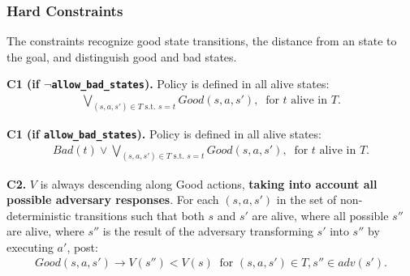 \documentclass[a4paper]{article}
\newcommand{\smallpar}[1]{{\vspace{10pt}\noindent \bf #1.}}
\newcommand{\badtx}{\ensuremath{\mathrm{BAD}}}
\begin{document}
\subsubsection{Hard Constraints}

The constraints recognize good state transitions, the distance from an state to the goal, and distinguish good and bad states.

\smallpar{C1 (if $\neg$\texttt{allow\_bad\_states})}
Policy is defined in all alive states:
\begin{align*}
\bigvee_{(s, a, s') \in T \text{ s.t. } s=t} Good(s, a, s'), \;\; \text{for $t$ alive in $T$.}
\end{align*}


\smallpar{C1 (if \texttt{allow\_bad\_states})}
Policy is defined in all alive states:
\begin{align*}
Bad(t) \lor \bigvee_{(s, a, s') \in T \text{ s.t. } s=t} Good(s, a, s'), \;\; \text{for $t$ alive in $T$.}
\end{align*}


\smallpar{C2} $V$ is always descending along Good actions, \textbf{taking into account all possible adversary responses}. For each $(s, a, s')$ in the set of non-deterministic transitions such that both $s$ and $s'$ are alive, where all possible $s''$ are alive, where $s''$ is the result of the adversary transforming $s'$ into $s''$ by executing $a'$, post:
\begin{align*}
Good(s, a, s') \rightarrow V(s'') < V(s)  \;\; \text{for } (s, a, s') \in T,  s'' \in adv(s').
\end{align*}


\end{document}
